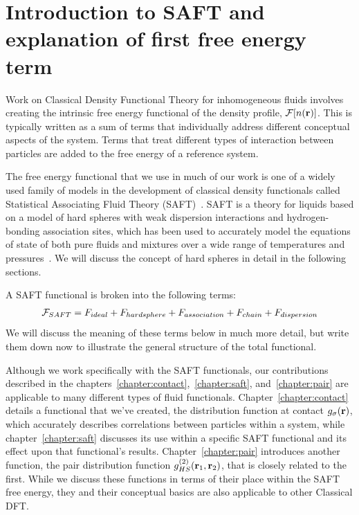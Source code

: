 \clearpage
\newpage



\section{Introduction to SAFT and explanation of first free energy term}

Work on Classical Density Functional Theory for inhomogeneous fluids
involves creating the intrinsic free energy functional of the density
profile, $\mathcal{F}[n(\textbf{r})]$.  This is typically written as a sum of terms
that individually address different conceptual aspects of the system.
Terms that treat different types of interaction between particles are
added to the free energy of a reference system.

The free energy functional that we use in much of our work is one of a
widely used family of models in the development of classical density
functionals called Statistical Associating Fluid Theory
(SAFT)~\cite{chapman1989saft}.  SAFT is a theory for liquids based on
a model of hard spheres with weak dispersion interactions and
hydrogen-bonding association sites, which has been used to accurately
model the equations of state of both pure fluids and mixtures over a
wide range of temperatures and pressures~\cite{muller2001molecular,
tan2008recent}. We will discuss the concept of hard spheres in detail
in the following sections.

A SAFT functional is broken into the following terms:
\begin{align}
  \mathcal{F}_{SAFT} = F_{ideal} + F_{hard sphere} + F_{association} + F_{chain} + F_{dispersion}
\end{align}
We will discuss the meaning of these terms below in much more detail,
but write them down now to illustrate the general structure of the total
functional.


Although we work specifically with the SAFT functionals, our
contributions described in the
chapters~\ref{chapter:contact},~\ref{chapter:saft},
and~\ref{chapter:pair} are applicable to many different types of fluid
functionals.  Chapter~\ref{chapter:contact} details a functional that
we've created, the distribution function at contact $g_\sigma(\textbf{r})$,
which accurately describes correlations between particles within a
system, while chapter~\ref{chapter:saft} discusses its use within a
specific SAFT functional and its effect upon that functional's
results.  Chapter~\ref{chapter:pair} introduces another function, the
pair distribution function $g^{(2)}_{HS}(\textbf{r}_1,\textbf{r}_2)$, that is
closely related to the first.  While we discuss these functions in
terms of their place within the SAFT free energy, they and their
conceptual basics are also applicable to other Classical DFT.

